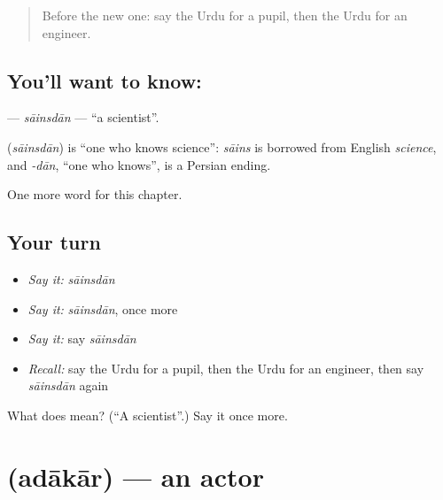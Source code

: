 \label{lesson:UR-C262-sainsdan}



\begin{quote}
Before the new one: say the Urdu for a pupil, then the Urdu for an engineer.
\end{quote}

\subsection*{You'll want to know: }
\textbf{} — \emph{sāinsdān} — \textquotedblleft{}a scientist\textquotedblright{}.

\begin{cousinweb}
\textbf{} (\emph{sāinsdān}) is \textquotedblleft{}one who knows science\textquotedblright{}: \emph{sāins} is borrowed from English \emph{science}, and \emph{-dān}, \textquotedblleft{}one who knows\textquotedblright{}, is a Persian ending.
\end{cousinweb}

\begin{grammarlens}[title={What you've built}]
One more word for this chapter.
\end{grammarlens}

\subsection*{Your turn}
\begin{itemize}
\raggedright
  \item \emph{Say it:} \emph{sāinsdān}
  \item \emph{Say it:} \emph{sāinsdān}, once more
  \item \emph{Say it:} say \emph{sāinsdān}
  \item \emph{Recall:} say the Urdu for a pupil, then the Urdu for an engineer, then say \emph{sāinsdān} again
\end{itemize}

\begin{tcolorbox}[breakable,colback=teal!4,colframe=teal!35!black,title={Before you move on}]
What does  mean? (\textquotedblleft{}A scientist\textquotedblright{}.) Say it once more.
\end{tcolorbox}
\section[\texorpdfstring{\ur{اداکار} (adākār)}{اداکار (adākār)}]{ (adākār) — an actor}


